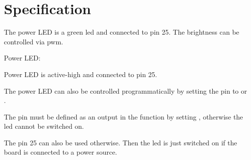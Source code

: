 

\begin{center}    

\end{center}

    

\section{Specification}

The power LED is a green \ac{led} and connected to pin 25. The brightness can be controlled via \ac{pwm}.

\begin{description}
    \item [Power LED:] 
\end{description}

Power LED is active-high and connected to pin 25.

The power LED can also be controlled programmatically by setting the pin to  or . 



The pin must be defined as an output in the function  by setting , otherwise the \ac{led} cannot be switched on.

\medskip 


The pin 25 can also be used otherwise. Then the \ac{led} is just switched on if the board is connected to a power source. 

